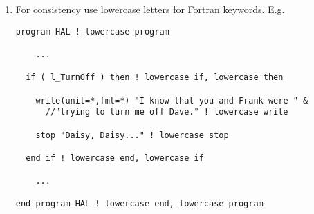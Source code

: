 \documentclass[letterpaper,12pt]{article}
\begin{document}
\begin{enumerate}

\item For consistency use lowercase letters for Fortran keywords. \newline
E.g.
\begin{verbatim}
program HAL ! lowercase program

    ... 

  if ( l_TurnOff ) then ! lowercase if, lowercase then

    write(unit=*,fmt=*) "I know that you and Frank were " &
      //"trying to turn me off Dave." ! lowercase write

    stop "Daisy, Daisy..." ! lowercase stop

  end if ! lowercase end, lowercase if

    ...

end program HAL ! lowercase end, lowercase program 
\end{verbatim}


\end{enumerate}
\end{document}
